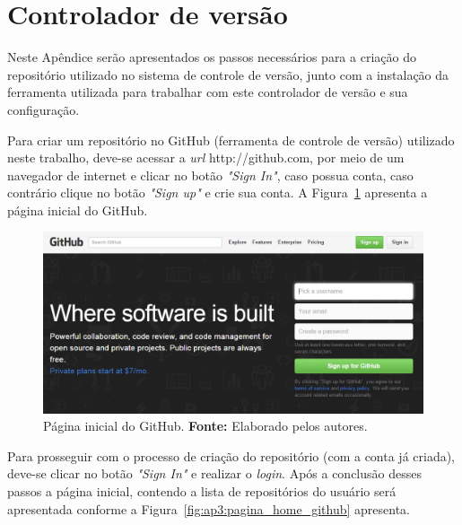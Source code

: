 \chapter*{Controlador de versão}
\label{ap3:github}

Neste Apêndice serão apresentados os passos necessários para a criação do repositório utilizado no sistema de controle de versão, junto com a instalação da ferramenta utilizada para trabalhar com este controlador de versão e sua configuração.

Para criar um repositório no GitHub (ferramenta de controle de versão) utilizado neste trabalho, deve-se acessar a  \textit{url} http://github.com, por meio de um navegador de internet e clicar no botão \textit{"Sign In"}, caso possua conta, caso contrário clique no botão \textit{"Sign up"} e crie sua conta. A Figura~\ref{fig:ap3:pagina_inicial_github} apresenta a página inicial do GitHub.

\captionsetup[figure]{list=no}
\begin{figure}[h!]
	\centerline{\includegraphics[scale=0.5]{./imagens/apendices/pagina-inicial-github.png}}
	\caption[Página inicial do GitHub.]
	{Página inicial do GitHub. \textbf{Fonte:} Elaborado pelos autores.}
	\label{fig:ap3:pagina_inicial_github}
\end{figure}

Para prosseguir com o processo de criação do repositório (com a conta já criada), deve-se clicar no botão \textit{"Sign In"} e realizar o \textit{login}. Após a conclusão desses passos a página inicial, contendo a lista de repositórios do usuário será apresentada conforme a Figura~\ref{fig:ap3:pagina_home_github} apresenta.

